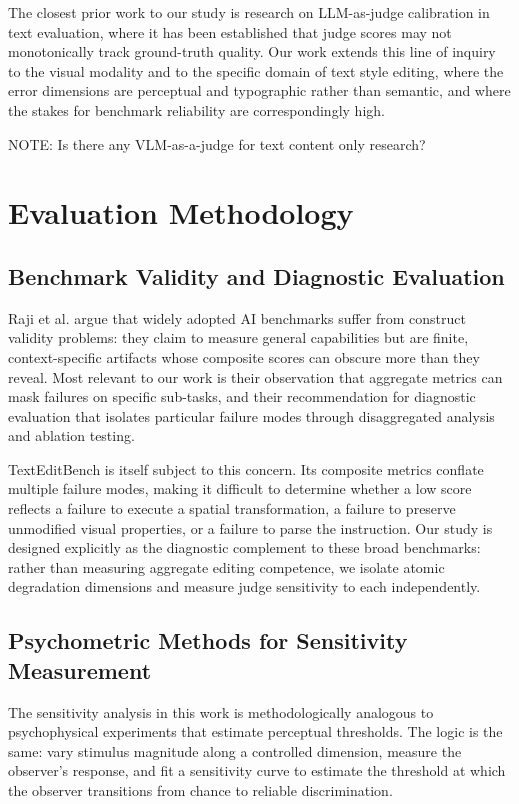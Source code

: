 The closest prior work to our study is research on LLM-as-judge calibration in text evaluation, where it has been established that judge scores may not monotonically track ground-truth quality. Our work extends this line of inquiry to the visual modality and to the specific domain of text style editing, where the error dimensions are perceptual and typographic rather than semantic, and where the stakes for benchmark reliability are correspondingly high.

NOTE: Is there any VLM-as-a-judge for text content only research?

\section{Evaluation Methodology}

\label{Evaluation Methodology}

\subsection{Benchmark Validity and Diagnostic Evaluation}

Raji et al. \cite{raji2021everything} argue that widely adopted AI benchmarks suffer from construct validity problems: they claim to measure general capabilities but are finite, context-specific artifacts whose composite scores can obscure more than they reveal. Most relevant to our work is their observation that aggregate metrics can mask failures on specific sub-tasks, and their recommendation for diagnostic evaluation that isolates particular failure modes through disaggregated analysis and ablation testing.

TextEditBench is itself subject to this concern. Its composite metrics conflate multiple failure modes, making it difficult to determine whether a low score reflects a failure to execute a spatial transformation, a failure to preserve unmodified visual properties, or a failure to parse the instruction. Our study is designed explicitly as the diagnostic complement to these broad benchmarks: rather than measuring aggregate editing competence, we isolate atomic degradation dimensions and measure judge sensitivity to each independently.

\subsection{Psychometric Methods for Sensitivity Measurement}

The sensitivity analysis in this work is methodologically analogous to psychophysical experiments that estimate perceptual thresholds. The logic is the same: vary stimulus magnitude along a controlled dimension, measure the observer's response, and fit a sensitivity curve to estimate the threshold at which the observer transitions from chance to reliable discrimination.

